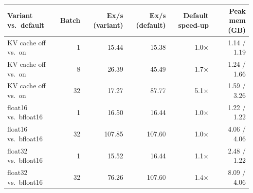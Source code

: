 \begin{tabular}{lrrrrr}
\toprule
Variant vs.\ default & Batch & Ex/s (variant) & Ex/s (default) & Default speed-up & Peak mem (GB) \\
\midrule
KV cache off vs.\ on & 1 & 15.44 & 15.38 & 1.0$\times$ & 1.14 / 1.19 \\
KV cache off vs.\ on & 8 & 26.39 & 45.49 & 1.7$\times$ & 1.24 / 1.66 \\
KV cache off vs.\ on & 32 & 17.27 & 87.77 & 5.1$\times$ & 1.59 / 3.26 \\
float16 vs.\ bfloat16 & 1 & 16.50 & 16.44 & 1.0$\times$ & 1.22 / 1.22 \\
float16 vs.\ bfloat16 & 32 & 107.85 & 107.60 & 1.0$\times$ & 4.06 / 4.06 \\
float32 vs.\ bfloat16 & 1 & 15.52 & 16.44 & 1.1$\times$ & 2.48 / 1.22 \\
float32 vs.\ bfloat16 & 32 & 76.26 & 107.60 & 1.4$\times$ & 8.09 / 4.06 \\
\bottomrule
\end{tabular}